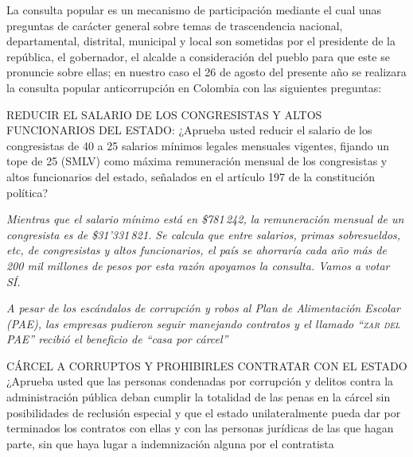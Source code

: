 \documentclass[twoside]{article}
\begin{document}
La consulta popular es un mecanismo de participación mediante el cual unas preguntas de carácter general sobre temas de trascendencia nacional, departamental, distrital, municipal y local son sometidas por el presidente de la república, el gobernador, el alcalde a consideración del pueblo para que este se pronuncie sobre ellas; en nuestro caso el 26 de agosto del presente año se realizara la consulta popular anticorrupción en Colombia con las siguientes preguntas:
\begin{enumerate}
  \begin{minipage}{0.5\textwidth}
  \item REDUCIR EL SALARIO DE LOS CONGRESISTAS Y ALTOS FUNCIONARIOS DEL ESTADO: ¿Aprueba usted reducir el salario de los congresistas de 40 a 25 salarios mínimos legales mensuales vigentes, fijando un tope de 25 (SMLV) como máxima remuneración mensual de los congresistas y altos funcionarios del estado, señalados en el artículo 197 de la constitución política?
  \end{minipage}\hfill
  \begin{minipage}{0.4\textwidth}
    \begin{shaded}
\emph{Mientras que el salario mínimo está en \$781\,242, la remuneración mensual de un congresista es de \$31'331\,821. Se calcula que entre salarios, primas sobresueldos, etc, de congresistas y altos funcionarios, el país se ahorraría cada año más de 200 mil millones de pesos por esta razón apoyamos la consulta. Vamos a votar SÍ.}
      \end{shaded}
    \end{minipage}
    \begin{minipage}{0.35\linewidth}
      \begin{shaded}
\emph{      A pesar de los escándalos de corrupción y robos al Plan de Alimentación Escolar (PAE), las empresas pudieron seguir manejando contratos y el llamado \textsc{``zar del PAE''} recibió el beneficio de ``casa por cárcel''}
    \end{shaded}
    \end{minipage}\hfill
    \begin{minipage}{0.6\linewidth}
  \item CÁRCEL A CORRUPTOS Y PROHIBIRLES CONTRATAR CON EL ESTADO ¿Aprueba usted que las personas condenadas por corrupción y delitos contra la administración pública deban cumplir la totalidad de las penas en la cárcel sin posibilidades de reclusión especial y que el estado unilateralmente pueda dar por terminados los contratos con ellas y con las personas jurídicas  de las que hagan parte, sin que haya lugar  a indemnización alguna por el contratista

\end{minipage}
\end{enumerate}
\end{document}
